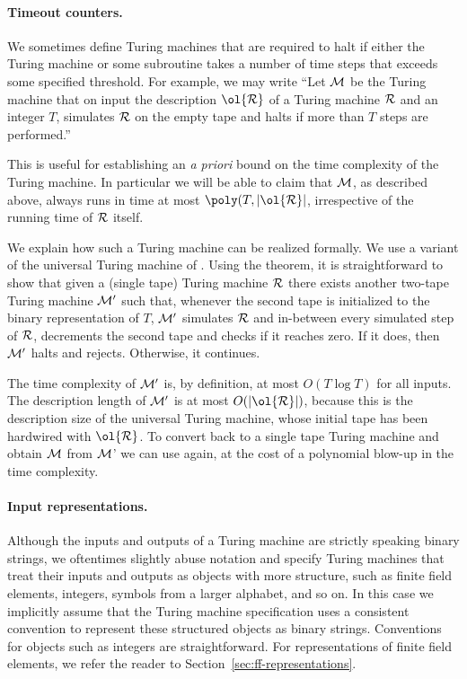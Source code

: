 \paragraph{Timeout counters.} We sometimes define Turing machines that are required to halt if 
either the Turing machine or some subroutine takes a number of time steps that exceeds some specified threshold. For example, we may write ``Let $\cal{M}$ be the Turing machine that on input the description $\ol{\cal{R}}$ of a Turing machine $\cal{R}$ and an integer $T$, simulates $\cal{R}$ on the empty tape and halts if more than $T$ steps are performed.''

This is useful for establishing an \emph{a priori} bound on the time complexity of the Turing machine. In particular we will be able to claim that $\cal{M}$, as described above, always runs in time at most $\poly(T,|\ol{\cal{R}}|$, irrespective of the running time of $\cal{R}$ itself.

We explain how such a Turing machine can be realized formally. We use a variant of the universal Turing machine of . Using the theorem, it is straightforward to show that given a (single tape) Turing machine $\cal{R}$ there exists another two-tape Turing machine $\cal{M}'$ such that, whenever the second tape is initialized to the binary representation of $T$, $\cal{M}'$ simulates $\cal{R}$ and in-between every simulated step of $\cal{R}$, decrements the second tape and checks if it reaches zero. If it does, then $\cal{M}'$ halts and rejects. Otherwise, it continues. 

The time complexity of $\cal{M}'$ is, by definition, at most $O(T \log T)$ for all inputs. The description length of $\cal{M}'$ is at most $O(|\ol{\cal{R}}|)$, because this is the description size of the universal Turing machine, whose initial tape has been hardwired with $\ol{\cal{R}}$.
To convert back to a single tape Turing machine and obtain $\cal{M}$ from $\cal{M}$' we can use  again, at the cost of a polynomial blow-up in the time complexity.


\paragraph{Input representations.} 
Although the inputs and outputs of a Turing machine are strictly speaking
  binary strings, we oftentimes slightly abuse notation and specify Turing
  machines that treat their inputs and outputs as objects with more structure,
  such as finite field elements, integers, symbols from a larger alphabet, and
  so on.
  In this case we implicitly assume that the Turing machine specification uses a
  consistent convention to represent these structured objects as binary strings.
  Conventions for objects such as integers are straightforward.
  For representations of finite field elements, we refer the reader to
  Section~\ref{sec:ff-representations}.


